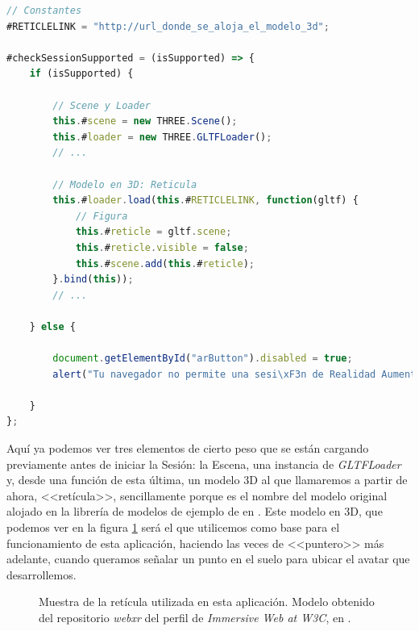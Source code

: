 \documentclass{subfiles}
\begin{document}
\newpage
\begin{lstlisting}[language=JavaScript, caption={Carga de elementos de Three.js si se soporta la sesión.}, label={lst:3.1}]
// Constantes
#RETICLELINK = "http://url_donde_se_aloja_el_modelo_3d";

#checkSessionSupported = (isSupported) => {
    if (isSupported) {
    
        // Scene y Loader
        this.#scene = new THREE.Scene();
        this.#loader = new THREE.GLTFLoader();
        // ...

        // Modelo en 3D: Reticula
        this.#loader.load(this.#RETICLELINK, function(gltf) {
            // Figura
            this.#reticle = gltf.scene;
            this.#reticle.visible = false;
            this.#scene.add(this.#reticle);
        }.bind(this));
        // ...
    
    } else {
    
        document.getElementById("arButton").disabled = true;
        alert("Tu navegador no permite una sesi\xF3n de Realidad Aumentada.");
        
    }
};
\end{lstlisting}

        Aquí ya podemos ver tres elementos de cierto peso que se están cargando previamente antes de iniciar la Sesión: la Escena, una instancia de \textit{GLTFLoader} y, desde una función de esta última, un modelo 3D al que llamaremos a partir de ahora, <<retícula>>, sencillamente porque es el nombre del modelo original alojado en la librería de modelos de ejemplo de \webxr en \github. Este modelo en 3D, que podemos ver en la figura \ref{fig:reticle} será el que utilicemos como base para el funcionamiento de esta aplicación, haciendo las veces de <<puntero>> más adelante, cuando queramos señalar un punto en el suelo para ubicar el avatar que desarrollemos.

        \begin{figure}
        \centering
        \caption{Muestra de la retícula utilizada en esta aplicación. Modelo obtenido del repositorio \textit{webxr} del perfil de \textit{Immersive Web at W3C}, en \github.}
        \label{fig:reticle}
        \end{figure}
\end{document}
